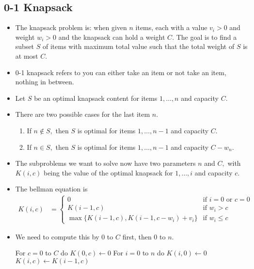 \documentclass[a4paper,12pt]{article}
\begin{document}
\subsection{0-1 Knapsack}
\begin{itemize}
    \item The knapsack problem is: when given $n$ items, each with a value $v_i>0$ and weight $w_i>0$ and the knapsack can hold a weight $C.$ The goal is to find a subset $S$ of items with maximum total value such that the total weight of $S$ is at most $C.$
    \item 0-1 knapsack refers to you can either take an item or not take an item, nothing in between.
    \item Let $S$ be an optimal knapsack content for items $1,\dots,n$ and capacity $C.$
    \item There are two possible cases for the last item $n.$\begin{enumerate}
        \item If $n\notin S,$ then $S$ is optimal for items $1,\dots,n-1$ and capacity $C.$
        \item If $n\in S,$ then $S$ is optimal for items $1,\dots,n-1$ and capacity $C-w_n.$
    \end{enumerate}
    \item The subproblems we want to solve now have two parameters $n$ and $C,$ with $K(i,c)$ being the value of the optimal knapsack for $1,\dots,i$ and capacity $c.$
    \item The bellman equation is \begin{align}
        K(i,c)&=\begin{cases}
            0&\text{if $i=0$ or $c=0$}\\
            K(i-1,c)&\text{if $w_i>c$}\\
            \max\{K(i-1,c),K(i-1,c-w_i)+v_i\}&\text{if $w_i\leq c$}
        \end{cases}
    \end{align}
    \item We need to compute this by $0$ to $C$ first, then $0$ to $n.$
    \begin{algorithmic}[1]
        \State For $c=0$ to $C$ do $K(0,c)\gets 0$
        \State For $i=0$ to $n$ do $K(i,0)\gets 0$
                    \State $K(i,c)\gets K(i-1,c)$
                \Else{}

\end{algorithmic}
\end{itemize}
\end{document}
